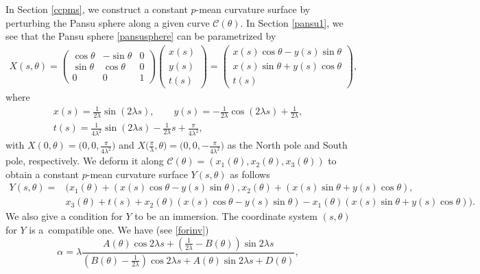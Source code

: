 \documentclass[10pt,a4paper]{amsart}
\numberwithin{equation}{section}
\begin{document}
In Section \ref{ccpms}, we construct a constant $p$-mean curvature surface by perturbing the Pansu sphere along a given curve $\mathcal{C}(\theta)$. In Section \ref{pansu1}, we see that the Pansu sphere \eqref{pansusphere} can be parametrized by
\begin{gather*} %
X(s,\theta)= \left(
\begin{matrix}
\cos \theta & -\sin \theta & 0 \\
\sin \theta & \cos \theta & 0 \\
0 & 0 & 1
\end{matrix}
\right)\left(
\begin{matrix}
x(s) \\
y(s) \\
t(s)
\end{matrix}
\right)=\left(
\begin{matrix}
x(s)\cos \theta-y(s)\sin \theta \\
x(s)\sin \theta+y(s)\cos \theta \\
t(s)
\end{matrix}
\right),
\end{gather*}
where
\begin{gather*} %
x(s) = \frac{1}{2\lambda}\sin(2\lambda s),\qquad
y(s) = -\frac{1}{2\lambda}\cos(2\lambda s)+ \frac{1}{2\lambda},\\
t(s) = \frac{1}{4\lambda^2}\sin(2\lambda s)- \frac{1}{2\lambda}s+\frac{\pi}{4\lambda^2},
\end{gather*}
with $X(0,\theta)=\bigl(0,0,\frac{\pi}{4\lambda^2}\bigr)$ and $X\bigl(\frac{\pi}{\lambda},\theta\bigr)=\bigl(0,0,-\frac{\pi}{4\lambda^2}\bigr)$ as the North pole and South pole, respectively.
We deform it along $\mathcal{C}(\theta)=(x_{1}(\theta), x_{2}(\theta), x_{3}(\theta))$ to obtain a constant $p$-mean curvature surface $Y(s,\theta)$ as follows
\begin{align*} %
Y(s,\theta)={}&(x_{1}(\theta)+(x(s)\cos{\theta}-y(s)\sin{\theta}),x_{2}(\theta)+(x(s)\sin{\theta}+y(s)\cos{\theta}), \\
&x_{3}(\theta)+t(s)+x_{2}(\theta)(x(s)\cos{\theta}-y(s)\sin{\theta})
-x_{1}(\theta)(x(s)\sin{\theta}+y(s)\cos{\theta})).
\end{align*}
We also give a condition for $Y$ to be an immersion. The coordinate system $(s,\theta)$ for $Y$
is a~compatible one. We have (see \eqref{forinv})
\begin{equation}\label{forinvi}
\alpha =\lambda \frac{A(\theta )\cos {2\lambda s}+\left( \frac{1}{2\lambda }-B(\theta )\right) \sin {2\lambda s}}{\left( B(\theta )-\frac{1}{2\lambda }\right) \cos {2\lambda s}+A(\theta )\sin {2\lambda s}+D(\theta )},
\end{equation}
\end{document}
